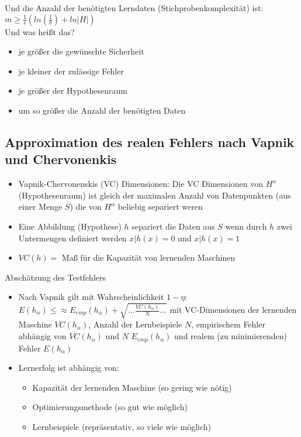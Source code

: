 \documentclass[paper=a4, fontsize=11pt]{scrartcl} %
\numberwithin{equation}{section} %
\numberwithin{figure}{section} %
\numberwithin{table}{section} %
\begin{document}
Und die Anzahl der benötigten Lerndaten (Stichprobenkomplexität) ist: $m \ge \frac{1}{\epsilon}(ln(\frac{1}{\delta})+ln|H|)$\\ 
Und was heißt das?
\begin{itemize}
\item je größer die gewünschte Sicherheit
\item je kleiner der zulässige Fehler
\item je größer der Hypothesenraum
\item um so größer die Anzahl der benötigten Daten
\end{itemize}

\subsection{Approximation des realen Fehlers nach Vapnik und Chervonenkis}

\begin{itemize}
\item Vapnik-Chervonenskis (VC) Dimensionen: Die VC Dimensionen von $H^\alpha$
 (Hypothesenraum) ist gleich der maximalen Anzahl von Datenpunkten (aus einer Menge $S$) die von $H^\alpha$ beliebig separiert weren
\item Eine Abbildung (Hypothese) $h$ separiert die Daten aus $S$ wenn durch $h$ zwei Untermengen definiert werden ${x|h(x)=0}$ und ${x|h(x)=1}$
\item $VC(h) =$ Maß für die Kapazität von lernenden Maschinen
\end{itemize}

Abschätzung des Testfehlers
\begin{itemize}
\item Nach Vapnik gilt mit Wahrscheinlichkeit $1-\eta$: $E(h_\alpha) \le \approx E_{emp}(h_\alpha) + \sqrt{... \frac{VC(h_\alpha)}{N}...}$ mit VC-Dimensionen der lernenden Maschine $VC(h_\alpha)$, Anzahl der Lernbeispiele $N$, empirischem Fehler abhängig von $VC(h_\alpha)$ und $N$ $E_{emp}(h_\alpha)$ und realem (zu minimierenden) Fehler $E(h_\alpha)$
\item Lernerfolg ist abhängig von:
\begin{itemize}
\item Kapazität der lernenden Maschine (so gering wie nötig)
\item Optimierungsmethode (so gut wie möglich)
\item Lernbeispiele (repräsentativ, so viele wie möglich)
\end{itemize}
\end{itemize}
\end{document}
